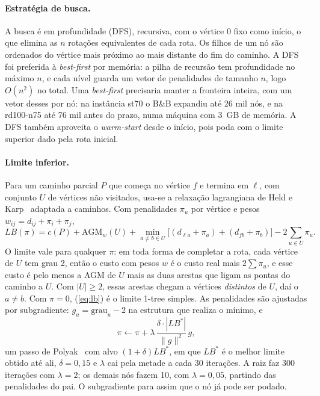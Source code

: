 \paragraph{Estratégia de busca.} A busca é em profundidade (DFS), recursiva, com o
vértice 0 fixo como início, o que elimina as $n$ rotações equivalentes de cada rota. Os
filhos de um nó são ordenados do vértice mais próximo ao mais distante do fim do caminho.
A DFS foi preferida à \emph{best-first} por memória: a pilha de recursão tem profundidade
no máximo $n$, e cada nível guarda um vetor de penalidades de tamanho $n$, logo $O(n^2)$
no total. Uma \emph{best-first} precisaria manter a fronteira inteira, com um vetor desses
por nó: na instância st70 o B\&B expandiu até 26 mil nós, e na rd100-n75 até 76 mil
antes do prazo, numa máquina com 3~GB de memória. A DFS também aproveita o
\emph{warm-start} desde o início, pois poda com o limite superior dado pela rota inicial.

\paragraph{Limite inferior.} Para um caminho parcial $P$ que começa no vértice $f$ e
termina em $\ell$, com conjunto $U$ de vértices não visitados, usa-se a relaxação
lagrangiana de Held e Karp~\cite{held1970,held1971} adaptada a caminhos. Com penalidades
$\pi_u$ por vértice e pesos $w_{ij} = d_{ij} + \pi_i + \pi_j$,
\begin{equation}
  LB(\pi) = c(P) + \mathrm{AGM}_w(U)
          + \min_{a \neq b \in U}\bigl[(d_{\ell a} + \pi_a) + (d_{f b} + \pi_b)\bigr]
          - 2\sum_{u \in U} \pi_u .
  \label{eq:lb}
\end{equation}
O limite vale para qualquer $\pi$: em toda forma de completar a rota, cada vértice de $U$
tem grau 2, então o custo com pesos $w$ é o custo real mais $2\sum\pi_u$, e esse custo é
pelo menos a AGM de $U$ mais as duas arestas que ligam as pontas do caminho a $U$. Com
$|U| \geq 2$, essas arestas chegam a vértices \emph{distintos} de $U$, daí o
$a \neq b$. Com $\pi = 0$, (\ref{eq:lb}) é o limite 1-tree simples. As penalidades são ajustadas
por subgradiente: $g_u = \text{grau}_u - 2$ na estrutura que realiza o mínimo, e
\[
  \pi \leftarrow \pi + \lambda \, \frac{\delta \cdot |LB^*|}{\|g\|^2}\, g ,
\]
um passo de Polyak~\cite{polyak1969} com alvo $(1+\delta)LB^*$, em que $LB^*$ é o melhor
limite obtido até ali, $\delta = 0{,}15$ e $\lambda$ cai pela metade a cada 30
iterações. A raiz faz 300 iterações com $\lambda = 2$; os demais nós fazem 10, com
$\lambda = 0{,}05$, partindo das penalidades do pai. O subgradiente para assim que o
nó já pode ser podado.

